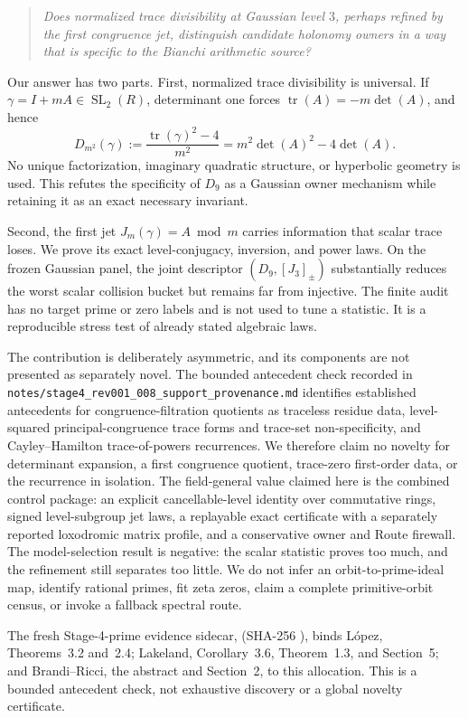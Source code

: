 \documentclass[11pt,a4paper]{article}
\theoremstyle{definition}
\theoremstyle{remark}
\newcommand{\SL}{\operatorname{SL}}
\newcommand{\tr}{\operatorname{tr}}
\begin{document}
\begin{quote}
\emph{Does normalized trace divisibility at Gaussian level \(3\), perhaps refined by the first congruence jet, distinguish candidate holonomy owners in a way that is specific to the Bianchi arithmetic source?}
\end{quote}

Our answer has two parts. First, normalized trace divisibility is universal. If \(\gamma=I+mA\in\SL_2(R)\), determinant one forces \(\tr(A)=-m\det(A)\), and hence
\[
 D_{m^2}(\gamma):=\frac{\tr(\gamma)^2-4}{m^2}
 =m^2\det(A)^2-4\det(A).
\]
No unique factorization, imaginary quadratic structure, or hyperbolic geometry is used. This refutes the specificity of \(D_9\) as a Gaussian owner mechanism while retaining it as an exact necessary invariant.

Second, the first jet \(J_m(\gamma)=A\bmod m\) carries information that scalar trace loses. We prove its exact level-conjugacy, inversion, and power laws. On the frozen Gaussian panel, the joint descriptor \((D_9,[J_3]_{\pm})\) substantially reduces the worst scalar collision bucket but remains far from injective. The finite audit has no target prime or zero labels and is not used to tune a statistic. It is a reproducible stress test of already stated algebraic laws.

The contribution is deliberately asymmetric, and its components are not presented as separately novel. The bounded antecedent check recorded in \texttt{notes/stage4\_rev001\_008\_support\_provenance.md} identifies established antecedents for congruence-filtration quotients as traceless residue data, level-squared principal-congruence trace forms and trace-set non-specificity, and Cayley--Hamilton trace-of-powers recurrences. We therefore claim no novelty for determinant expansion, a first congruence quotient, trace-zero first-order data, or the recurrence in isolation. The field-general value claimed here is the combined control package: an explicit cancellable-level identity over commutative rings, signed level-subgroup jet laws, a replayable exact certificate with a separately reported loxodromic matrix profile, and a conservative owner and Route firewall. The model-selection result is negative: the scalar statistic proves too much, and the refinement still separates too little. We do not infer an orbit-to-prime-ideal map, identify rational primes, fit zeta zeros, claim a complete primitive-orbit census, or invoke a fallback spectral route.

The fresh Stage-4-prime evidence sidecar,  (SHA-256 ), binds López, Theorems~3.2 and~2.4; Lakeland, Corollary~3.6, Theorem~1.3, and Section~5; and Brandi--Ricci, the abstract and Section~2, to this allocation. This is a bounded antecedent check, not exhaustive discovery or a global novelty certificate.
\end{document}
